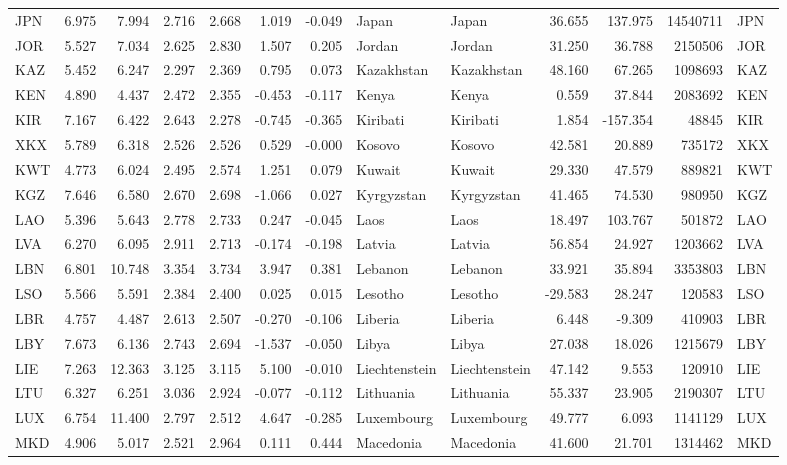 \begin{tabular}{lrrrrrrllrrrl}
JPN & 6.975 & 7.994 & 2.716 & 2.668 & 1.019 & -0.049 & Japan & Japan & 36.655 & 137.975 & 14540711 & JPN \\
JOR & 5.527 & 7.034 & 2.625 & 2.830 & 1.507 & 0.205 & Jordan & Jordan & 31.250 & 36.788 & 2150506 & JOR \\
KAZ & 5.452 & 6.247 & 2.297 & 2.369 & 0.795 & 0.073 & Kazakhstan & Kazakhstan & 48.160 & 67.265 & 1098693 & KAZ \\
KEN & 4.890 & 4.437 & 2.472 & 2.355 & -0.453 & -0.117 & Kenya & Kenya & 0.559 & 37.844 & 2083692 & KEN \\
KIR & 7.167 & 6.422 & 2.643 & 2.278 & -0.745 & -0.365 & Kiribati & Kiribati & 1.854 & -157.354 & 48845 & KIR \\
XKX & 5.789 & 6.318 & 2.526 & 2.526 & 0.529 & -0.000 & Kosovo & Kosovo & 42.581 & 20.889 & 735172 & XKX \\
KWT & 4.773 & 6.024 & 2.495 & 2.574 & 1.251 & 0.079 & Kuwait & Kuwait & 29.330 & 47.579 & 889821 & KWT \\
KGZ & 7.646 & 6.580 & 2.670 & 2.698 & -1.066 & 0.027 & Kyrgyzstan & Kyrgyzstan & 41.465 & 74.530 & 980950 & KGZ \\
LAO & 5.396 & 5.643 & 2.778 & 2.733 & 0.247 & -0.045 & Laos & Laos & 18.497 & 103.767 & 501872 & LAO \\
LVA & 6.270 & 6.095 & 2.911 & 2.713 & -0.174 & -0.198 & Latvia & Latvia & 56.854 & 24.927 & 1203662 & LVA \\
LBN & 6.801 & 10.748 & 3.354 & 3.734 & 3.947 & 0.381 & Lebanon & Lebanon & 33.921 & 35.894 & 3353803 & LBN \\
LSO & 5.566 & 5.591 & 2.384 & 2.400 & 0.025 & 0.015 & Lesotho & Lesotho & -29.583 & 28.247 & 120583 & LSO \\
LBR & 4.757 & 4.487 & 2.613 & 2.507 & -0.270 & -0.106 & Liberia & Liberia & 6.448 & -9.309 & 410903 & LBR \\
LBY & 7.673 & 6.136 & 2.743 & 2.694 & -1.537 & -0.050 & Libya & Libya & 27.038 & 18.026 & 1215679 & LBY \\
LIE & 7.263 & 12.363 & 3.125 & 3.115 & 5.100 & -0.010 & Liechtenstein & Liechtenstein & 47.142 & 9.553 & 120910 & LIE \\
LTU & 6.327 & 6.251 & 3.036 & 2.924 & -0.077 & -0.112 & Lithuania & Lithuania & 55.337 & 23.905 & 2190307 & LTU \\
LUX & 6.754 & 11.400 & 2.797 & 2.512 & 4.647 & -0.285 & Luxembourg & Luxembourg & 49.777 & 6.093 & 1141129 & LUX \\
MKD & 4.906 & 5.017 & 2.521 & 2.964 & 0.111 & 0.444 & Macedonia & Macedonia & 41.600 & 21.701 & 1314462 & MKD \\

\end{tabular}
